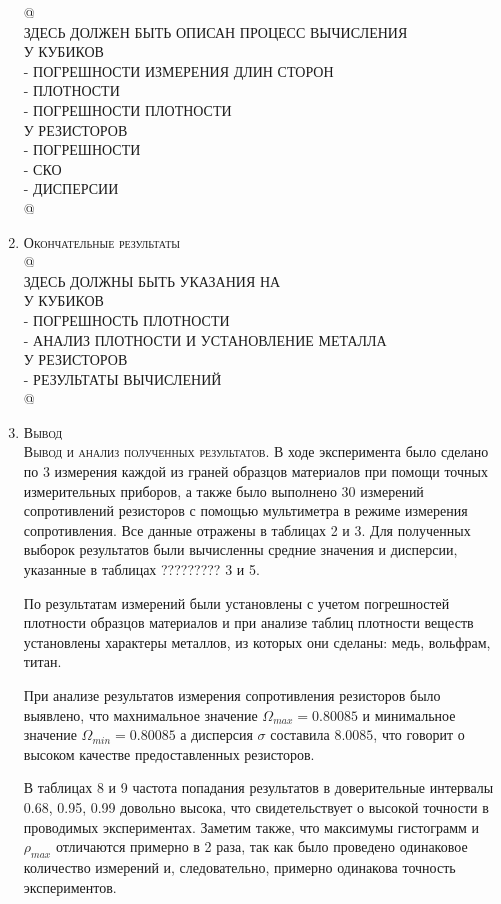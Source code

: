 \documentclass[12pt]{article}
\begin{document}
\begin{enumerate}
    @ \\
    ЗДЕСЬ ДОЛЖЕН БЫТЬ ОПИСАН ПРОЦЕСС ВЫЧИСЛЕНИЯ \\
    У КУБИКОВ \\
    - ПОГРЕШНОСТИ ИЗМЕРЕНИЯ ДЛИН СТОРОН \\
    - ПЛОТНОСТИ \\
    - ПОГРЕШНОСТИ ПЛОТНОСТИ \\
    У РЕЗИСТОРОВ \\
    - ПОГРЕШНОСТИ \\
    - СКО \\
    - ДИСПЕРСИИ \\
    @
    
    \item \large\textsc{Окончательные результаты} \\
    @ \\
    ЗДЕСЬ ДОЛЖНЫ БЫТЬ УКАЗАНИЯ НА \\
    У КУБИКОВ \\
    - ПОГРЕШНОСТЬ ПЛОТНОСТИ \\
    - АНАЛИЗ ПЛОТНОСТИ И УСТАНОВЛЕНИЕ МЕТАЛЛА \\
    У РЕЗИСТОРОВ \\
    - РЕЗУЛЬТАТЫ ВЫЧИСЛЕНИЙ \\
    @

    \item \large\textsc{Вывод}
\\ \textsc{Вывод и анализ полученных результатов.} В ходе эксперимента было сделано по 3 измерения каждой из граней образцов материалов при помощи точных измерительных приборов, а также было выполнено 30 измерений сопротивлений резисторов с помощью мультиметра в режиме измерения сопротивления. Все данные отражены в таблицах 2 и 3. Для полученных выборок результатов были вычисленны средние значения и дисперсии, указанные в таблицах ????????? 3 и 5.\par
По результатам измерений были установлены с учетом погрешностей плотности образцов материалов и при анализе таблиц плотности веществ установлены характеры металлов, из которых они сделаны: медь, вольфрам, титан. \par
При анализе результатов измерения сопротивления резисторов было выявлено, что махнимальное значение $\Omega_{max}=0.80085$ и минимальное значение $\Omega_{min}=0.80085$ а дисперсия $\sigma$ составила $8.0085$, что говорит о высоком качестве предоставленных резисторов.\par
В таблицах 8 и 9 частота попадания результатов в доверительные интервалы 0.68, 0.95, 0.99 довольно высока, что свидетельствует о высокой точности в проводимых экспериментах. Заметим также, что  максимумы гистограмм и $\rho_{max}$ отличаются примерно в 2 раза, так как было проведено одинаковое количество измерений и, следовательно, примерно одинакова точность экспериментов.
    
\end{enumerate}
\end{document}
